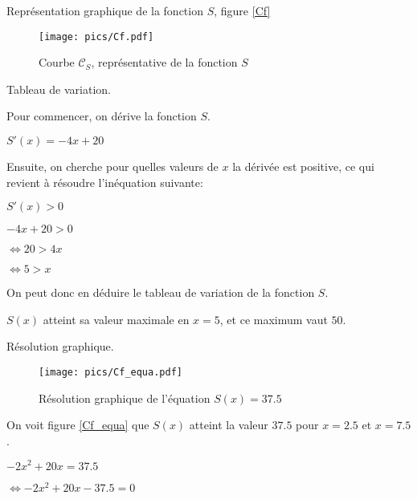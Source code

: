 \documentclass[a4paper,12pt]{scrartcl}
\begin{document}
\question{}
Représentation graphique de la fonction $S$, figure \vref{Cf}

\begin{figure}[h]
\begin{center}
\texttt{[image: pics/Cf.pdf]}
\end{center}
\caption{Courbe $\mathcal{C}_S$, représentative de la fonction $S$}
\label{Cf}
\end{figure}

\question{}
Tableau de variation.

\subquestion{}
Pour commencer, on dérive la fonction $S$. 

$S'(x) = -4x + 20$

Ensuite, on cherche pour quelles valeurs de $x$ la dérivée est positive, ce qui revient à résoudre l'inéquation suivante: 

$S'(x) > 0$

$-4x + 20 > 0$

$\Leftrightarrow 20 > 4x$

$\Leftrightarrow 5 > x$

On peut donc en déduire le tableau de variation de la fonction $S$.

\begin{center}
\end{center}


\subquestion{}
$S(x)$ atteint sa valeur maximale en $x = 5$, et ce maximum vaut $50$.

\question{}
Résolution graphique.

\subquestion{}

\begin{figure}
\begin{center}
\texttt{[image: pics/Cf\_equa.pdf]}
\end{center}
\caption{Résolution graphique de l'équation $S(x) = 37.5$}
\label{Cf_equa}
\end{figure}

On voit figure \vref{Cf_equa} que $S(x)$ atteint la valeur $37.5$ pour $x=2.5$ et $x=7.5$. 

\subquestion{}
$-2x^2 + 20x = 37.5$

$\Leftrightarrow -2x^2 + 20x - 37.5 = 0$ %
\end{document}
